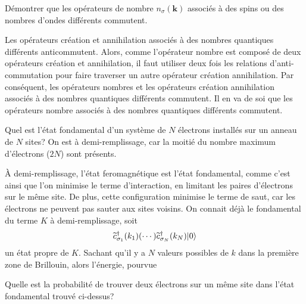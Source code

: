 \documentclass{subfiles}[../main.tex]
\begin{document}
            \begin{problem}
                Démontrer que les opérateurs de nombre
                $n_\sigma(\bm{k})$ associés à des spins ou
                des nombres d'ondes différents commutent.
            \end{problem}
            Les opérateurs création et annihilation associés à des nombres
            quantiques différents
            anticommutent. Alors, comme l'opérateur
            nombre est composé de deux opérateurs création et annihilation,
            il faut utiliser deux fois les relations d'anti-commutation pour
            faire traverser un autre opérateur création annihilation. Par
            conséquent, les opérateurs nombres et les opérateurs création
            annihilation associés à des nombres quantiques différents commutent.
            Il en va de soi que les opérateurs nombre associés à des nombres
            quantiques différents commutent.

            \begin{problem}
                Quel est l'état fondamental d'un système de
                $N$ électrons installés sur un anneau de
                $N$ sites? On est à demi-remplissage, car
                la moitié du nombre maximum d'électrons ($2N$) sont présents.
            \end{problem}
            À demi-remplissage, l'état feromagnétique est l'état fondamental,
            comme c'est ainsi que l'on minimise le terme d'interaction, en
            limitant les paires d'électrons sur le même site. De plus, cette
            configuration minimise le terme de saut, car les électrons ne
            peuvent pas sauter aux sites voisins. On connait déjà le
            fondamental du terme $K$ à demi-remplissage, soit
            \begin{align}
                \widetilde{c}^\dagger_{\sigma_1}(k_1)(\cdots)
                \widetilde{c}^\dagger_{\sigma_N}(k_N)|{0}\rangle
            \end{align}
            un état propre de $K$. Sachant qu'il y a $N$ valeurs possibles de
            $k$ dans la première zone de Brillouin, alors l'énergie, pourvue

            \begin{problem}
                Quelle est la probabilité de trouver deux électrons sur un même
                site dans l'état fondamental trouvé ci-dessus?
            \end{problem}
\end{document}

